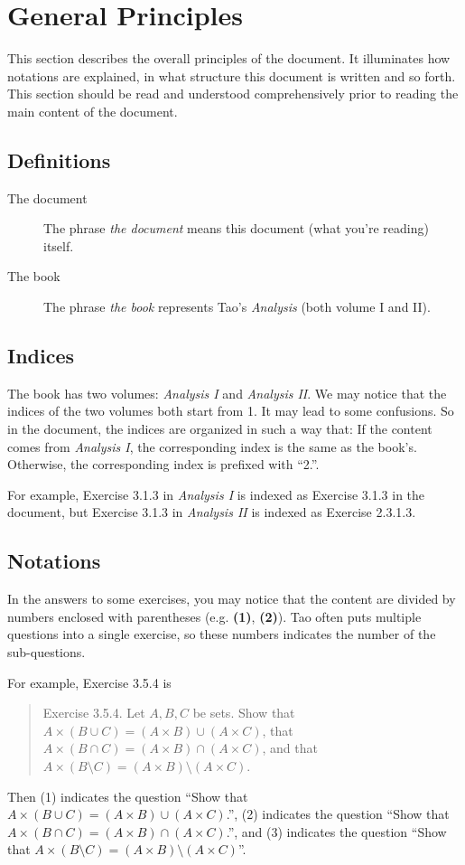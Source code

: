 \section{General Principles}
This section describes the overall principles of the document. It illuminates how notations are explained, 
in what structure this document is written and so forth. This section should be read and understood 
comprehensively prior to reading the main content of the document.

\subsection{Definitions}
\begin{description}
\item[The document] The phrase \emph{the document} means this document (what you're reading) itself.
\item[The book] The phrase \emph{the book} represents Tao's \emph{Analysis} (both volume I and II).
\end{description}

\subsection{Indices}
The book has two volumes: 
\emph{Analysis I} and \emph{Analysis II}. We may notice that the indices of the two volumes both start 
from 1. It may lead to some confusions. So in the document, the indices are organized in such a way that:
If the content comes from \emph{Analysis I}, the corresponding index is the same as the book's. 
Otherwise, the corresponding index is prefixed with ``2.''.

For example, Exercise 3.1.3 in \emph{Analysis I} is indexed as Exercise 3.1.3 in the document, but 
Exercise 3.1.3 in \emph{Analysis II} is indexed as Exercise 2.3.1.3.

\subsection{Notations}
In the answers to some exercises, you may notice that the content are divided by numbers enclosed with 
parentheses (e.g. \textbf{(1)}, \textbf{(2)}). Tao often puts multiple questions into a single exercise, 
so these numbers indicates the number of the sub-questions.

For example, Exercise 3.5.4 is 
\begin{quotation}
Exercise 3.5.4. Let $A,B,C$ be sets. Show that $A\times(B\cup C) = (A\times B)\cup(A\times C)$,
that $A\times(B\cap C) = (A\times B)\cap(A\times C)$, and that 
$ A\times(B\setminus C) = (A\times B)\setminus(A\times C)$.
\end{quotation}
Then (1) indicates the question ``Show that $A\times(B\cup C) = (A\times B)\cup(A\times C)$.'', 
(2) indicates the question ``Show that $A\times(B\cap C) = (A\times B)\cap(A\times C)$.'', and 
(3) indicates the question ``Show that $A\times(B\setminus C) = (A\times B)\setminus(A\times C)$''.

